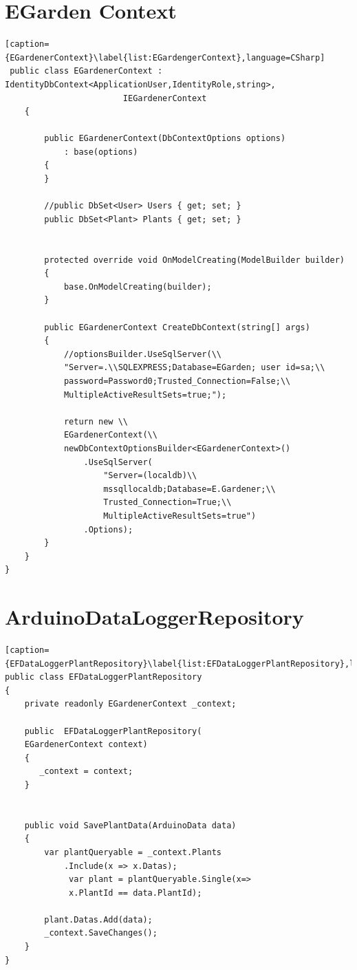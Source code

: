 \documentclass[a4paper,12pt,oneside,openright,titlepage]{book}
\begin{document}
\section{EGarden Context}
\begin{lstlisting}[caption={EGardenerContext}\label{list:EGardengerContext},language=CSharp]
 public class EGardenerContext : IdentityDbContext<ApplicationUser,IdentityRole,string>,
						IEGardenerContext
    {

        public EGardenerContext(DbContextOptions options)
            : base(options)
        {
        }

        //public DbSet<User> Users { get; set; }
        public DbSet<Plant> Plants { get; set; }


        protected override void OnModelCreating(ModelBuilder builder)
        {
            base.OnModelCreating(builder);
        }

        public EGardenerContext CreateDbContext(string[] args)
        {
            //optionsBuilder.UseSqlServer(\\
            "Server=.\\SQLEXPRESS;Database=EGarden; user id=sa;\\
            password=Password0;Trusted_Connection=False;\\
            MultipleActiveResultSets=true;");

            return new \\
            EGardenerContext(\\
            newDbContextOptionsBuilder<EGardenerContext>()
                .UseSqlServer(
                    "Server=(localdb)\\
                    mssqllocaldb;Database=E.Gardener;\\
                    Trusted_Connection=True;\\
                    MultipleActiveResultSets=true")
                .Options);
        }
    }
}

\end{lstlisting}
\section{ArduinoDataLoggerRepository}
\begin{lstlisting}[caption={EFDataLoggerPlantRepository}\label{list:EFDataLoggerPlantRepository},language=CSharp]
public class EFDataLoggerPlantRepository
{
	private readonly EGardenerContext _context;

	public	EFDataLoggerPlantRepository(
	EGardenerContext context)
	{
       _context = context;
	}


	public void SavePlantData(ArduinoData data)
	{
		var plantQueryable = _context.Plants
			.Include(x => x.Datas);
             var plant = plantQueryable.Single(x=>
             x.PlantId == data.PlantId);
             
		plant.Datas.Add(data);
		_context.SaveChanges();
	}
}
\end{lstlisting}
\end{document}
